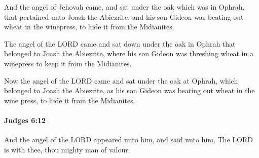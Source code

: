			\begin{versebox}
					\item[BHS] 
					\item[ASV] And the angel of Jehovah came, and sat under the oak which was in Ophrah, that pertained unto Joash the Abiezrite: and his son Gideon was beating out wheat in the winepress, to hide it from the Midianites.
					\item[NIV] The angel of the LORD came and sat down under the oak in Ophrah that belonged to Joash the Abiezrite, where his son Gideon was threshing wheat in a winepress to keep it from the Midianites.
					\item[NRSV] Now the angel of the LORD came and sat under the oak at Ophrah, which belonged to Joash the Abiezrite, as his son Gideon was beating out wheat in the wine press, to hide it from the Midianites.
			\end{versebox}

		\paragraph{Judges 6:12} %
			\label{JUDGES-6-12}

			And the angel of the LORD appeared unto him, and said unto him, The LORD is with thee, thou mighty man of valour.

